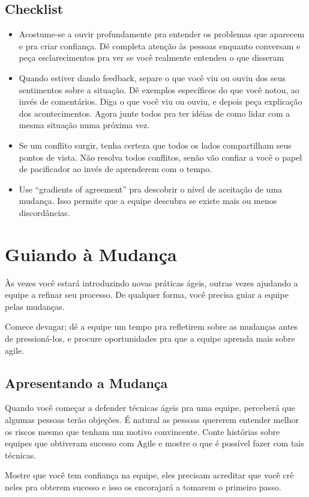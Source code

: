 \documentclass[a4paper, 10pt, font=plain]{abnt}
\begin{document}
\section{Checklist}
\begin{itemize}
\item Acostume-se a ouvir profundamente pra entender os problemas que aparecem e pra criar confiança. Dê completa atenção às pessoas enquanto conversam e peça esclarecimentos pra ver se você realmente entendeu o que disseram
\item Quando estiver dando feedback, separe o que você viu ou ouviu dos seus sentimentos sobre a situação. Dê exemplos específicos do que você notou, ao invés de comentários. Diga o que você viu ou ouviu, e depois peça explicação dos acontecimentos. Agora junte todos pra ter idéias de como lidar com a mesma situação numa próxima vez.
\item Se um conflito surgir, tenha certeza que todos os lados compartilham seus pontos de vista. Não resolva todos conflitos, senão vão confiar a você o papel de pacificador ao invés de aprenderem com o tempo.
\item Use ``gradients of agreement'' pra descobrir o nível de aceitação de uma mudança. Isso permite que a equipe descubra se existe mais ou menos discordâncias.
\end{itemize}


\chapter{Guiando à Mudança}
Às vezes você estará introduzindo novas práticas ágeis, outras vezes ajudando a equipe a refinar seu processo. De qualquer forma, você precisa guiar a equipe pelas mudanças.

Comece devagar; dê a equipe um tempo pra refletirem sobre as mudanças antes de pressioná-los, e procure oportunidades pra que a equipe aprenda mais sobre agile.

\section{Apresentando a Mudança}
Quando você começar a defender técnicas ágeis pra uma equipe, perceberá que algumas pessoas terão objeções. É natural as pessoas quererem entender melhor os riscos mesmo que tenham um motivo convincente. Conte histórias sobre equipes que obtiveram sucesso com Agile e mostre o que é possível fazer com tais técnicas.

Mostre que você tem confiança na equipe, eles precisam acreditar que você crê neles pra obterem sucesso e isso os encorajará a tomarem o primeiro passo.
\end{document}
